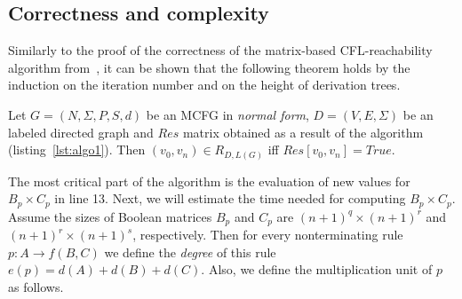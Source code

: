              





\subsection{Correctness and complexity}
Similarly to the proof of the correctness of the matrix-based CFL-reachability algorithm from~\cite{azimov2018context}, it can be shown that the following theorem holds by the induction on the iteration number and on the height of derivation trees.

\begin{mytheorem}\label{thm:correctness}
Let $G = (N, \Sigma, P, S, d)$ be an MCFG in \emph{normal form}, $D =(V, E, \Sigma)$ be an labeled directed graph and $Res$ matrix obtained as a result of the algorithm (listing~\ref{lst:algo1}). Then $(v_0, v_n) \in R_{D,L(G)}$ iff $Res[v_0,v_n] = True$.
\end{mytheorem}

The most critical part of the algorithm is the evaluation of new values for $B_p \times C_p$ in line 13. Next, we will estimate the time needed for computing $B_p \times C_p$. Assume the sizes of Boolean matrices $B_p$ and $C_p$ are $(n+1)^q \times (n+1)^r$ and $(n+1)^r \times (n+1)^s$, respectively. Then for every nonterminating rule $p: A \rightarrow f(B,C)$ we define the \textit{degree} of this rule $e(p) = d(A) + d(B) + d(C)$. Also, we define the multiplication unit of $p$ as follows.

